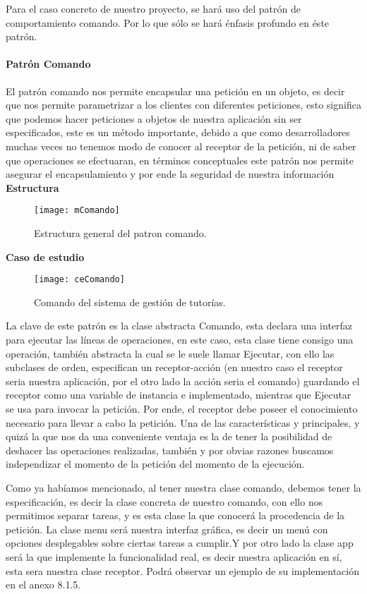 Para el caso concreto de nuestro proyecto, se hará uso del patrón de comportamiento comando. Por lo que sólo se hará énfasis profundo en éste patrón.
\paragraph{Patrón Comando}
El patrón comando nos permite encapsular una petición en un objeto, es decir que nos permite parametrizar a los clientes con diferentes peticiones, esto significa que podemos hacer peticiones a objetos de nuestra aplicación sin ser especificados, este es un método importante, debido a que como desarrolladores muchas veces no tenemos modo de conocer al receptor de la petición, ni de saber que operaciones se efectuaran, en términos conceptuales este patrón nos permite asegurar el encapsulamiento y por ende la seguridad de nuestra información
\newline
\indent\textbf{Estructura}
\begin{figure}[H]
	\centering
	\texttt{[image: mComando]}
    \centering
    \caption{Estructura general del patron comando.}
	\label{fig:mComando}
\end{figure}
\indent\textbf{Caso de estudio}
\begin{figure}[H]
	\centering
	\texttt{[image: ceComando]}
    \centering
    \caption{Comando del sistema de gestión de tutorías.}
	\label{fig:ceComando}
\end{figure}
\indent La clave de este patrón es la clase abstracta Comando, esta declara una interfaz para ejecutar las líneas de operaciones, en este caso, esta clase tiene consigo una operación, también abstracta la cual se le suele llamar Ejecutar, con ello las subclases de orden, especifican un receptor-acción (en nuestro caso el receptor seria nuestra aplicación, por el otro lado la acción seria el comando) guardando el receptor como una variable de instancia e implementado, mientras que Ejecutar se usa para invocar la petición. Por ende, el receptor debe poseer el conocimiento necesario para llevar a cabo la petición. Una de las características y principales, y quizá la que nos da una conveniente ventaja es la de tener la posibilidad de deshacer las operaciones realizadas, también y por obvias razones buscamos independizar el momento de la petición del momento de la ejecución.
\newline

Como ya habíamos mencionado, al tener nuestra clase comando, debemos tener la especificación, es decir la clase concreta de nuestro comando, con ello nos permitimos separar tareas, y es esta clase la que conocerá la procedencia de la petición.  La clase menu será nuestra interfaz gráfica, es decir un menú con opciones desplegables sobre ciertas tareas a cumplir.Y por otro lado la clase app será la que implemente la funcionalidad real, es decir nuestra aplicación en sí, esta sera nuestra clase receptor. Podrá observar un ejemplo de su implementación en el anexo 8.1.5.
\newpage
